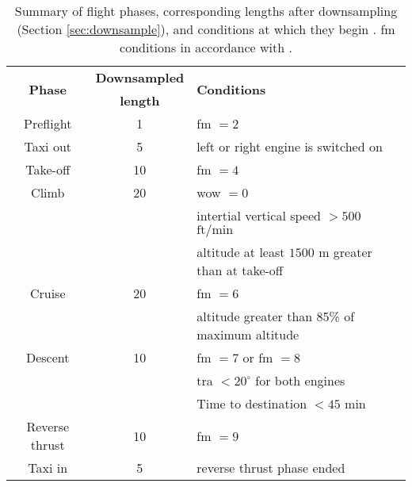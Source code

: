 \begin{table}
    \begin{center}
        \caption{\label{tab:flight_phases} Summary of flight phases, corresponding lengths after downsampling (Section \ref{sec:downsample}), and conditions at which they begin \cite[]{konig_br725stats_2018}. \ac{fm} conditions in accordance with \citet{reischl_br700-725a1-12_2014}.}
        \begin{tabular}{ c c l }
            \multirow{2}{*}{\textbf{Phase}} & \textbf{Downsampled} & \multirow{2}{*}{\textbf{Conditions}} \\
            & \textbf{length} & \\
            \midrule
            Preflight & 1 & \ac{fm} \(= 2\) \\
            Taxi out & 5 & left or right engine is switched on \\
            Take-off & 10 & \ac{fm} \(= 4\) \\
            Climb & 20 & \ac{wow} \(= 0\) \\
            & & intertial vertical speed \(> 500\) \(\text{ft} / \text{min}\) \\
            & & altitude at least \(1500 \) m greater than at take-off \\
            Cruise & 20 & \ac{fm} \(= 6\) \\
            & & altitude greater than 85\% of maximum altitude \\
            Descent & 10 & \ac{fm} \(= 7\) or \ac{fm} \(= 8\) \\
            & & \ac{tra} \(< 20^{\circ} \) for both engines \\
            & & Time to destination \(< 45\) \(\text{min}\) \\
            Reverse thrust & 10 & \ac{fm} \(= 9\) \\
            Taxi in & 5 & reverse thrust phase ended
        \end{tabular}
    \end{center}
\end{table}


